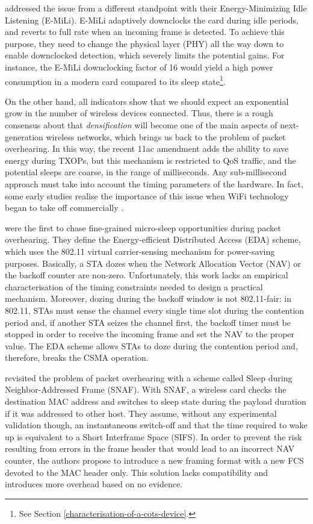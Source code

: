 \documentclass[twoside,nohyper]{tufte-book}
\begin{document}
\citet{Zhang2012} addressed the issue from a different standpoint with their Energy-Minimizing Idle Listening (E-MiLi). E-MiLi adaptively downclocks the card during idle periods, and reverts to full rate when an incoming frame is detected. To achieve this purpose, they need to change the physical layer (PHY) all the way down to enable downclocked detection, which severely limits the potential gains. For instance, the E-MiLi downclocking factor of 16 would yield a high power consumption in a modern card compared to its sleep state\footnote{See Section \ref{characterisation-of-a-cots-device}.}.

On the other hand, all indicators show that we should expect an exponential grow in the number of wireless devices connected. Thus, there is a rough consensus about that \emph{densification} will become one of the main aspects of next-generation wireless networks, which brings us back to the problem of packet overhearing. In this way, the recent 11ac amendment adds the ability to save energy during TXOPs, but this mechanism is restricted to QoS traffic, and the potential sleeps are coarse, in the range of milliseconds. Any sub-millisecond approach must take into account the timing parameters of the hardware. In fact, some early studies realise the importance of this issue when WiFi technology began to take off commercially \citep{kamerman1997, havinga2000, jung2002}.

\citet{Baiamonte2006} were the first to chase fine-grained micro-sleep opportunities during packet overhearing. They define the Energy-efficient Distributed Access (EDA) scheme, which uses the 802.11 virtual carrier-sensing mechanism for power-saving purposes. Basically, a STA dozes when the Network Allocation Vector (NAV) or the backoff counter are non-zero. Unfortunately, this work lacks an empirical characterisation of the timing constraints needed to design a practical mechanism. Moreover, dozing during the backoff window is not 802.11-fair: in 802.11, STAs must sense the channel every single time slot during the contention period and, if another STA seizes the channel first, the backoff timer must be stopped in order to receive the incoming frame and set the NAV to the proper value. The EDA scheme allows STAs to doze during the contention period and, therefore, breaks the CSMA operation.

\citet{Balaji2010} revisited the problem of packet overhearing with a scheme called Sleep during Neighbor-Addressed Frame (SNAF). With SNAF, a wireless card checks the destination MAC address and switches to sleep state during the payload duration if it was addressed to other host. They assume, without any experimental validation though, an instantaneous switch-off and that the time required to wake up is equivalent to a Short Interframe Space (SIFS). In order to prevent the risk resulting from errors in the frame header that would lead to an incorrect NAV counter, the authors propose to introduce a new framing format with a new FCS devoted to the MAC header only. This solution lacks compatibility and introduces more overhead based on no evidence.
\end{document}
